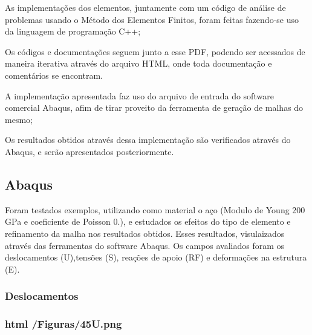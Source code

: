 \begin{DoxyItemize}
\item As implementações dos elementos, juntamente com um código de análise de problemas usando o Método dos Elementos Finitos, foram feitas fazendo-\/se uso da linguagem de programação C++;
\item Os códigos e documentações seguem junto a esse P\+DF, podendo ser acessados de maneira iterativa através do arquivo H\+T\+ML, onde toda documentação e comentários se encontram.
\item A implementação apresentada faz uso do arquivo de entrada do software comercial Abaqus, afim de tirar proveito da ferramenta de geração de malhas do mesmo;
\item Os resultados obtidos através dessa implementação são verificados através do Abaqus, e serão apresentados posteriormente.
\end{DoxyItemize}

\subsection*{Abaqus}


\begin{DoxyItemize}
\item Foram testados exemplos, utilizando como material o aço (Modulo de Young 200 G\+Pa e coeficiente de Poisson 0.), e estudados os efeitos do tipo de elemento e refinamento da malha nos resultados obtidos. Esses resultados, visulaizados através das ferramentas do software Abaqus. Os campos avaliados foram os deslocamentos (U),tensões (S), reações de apoio (RF) e deformações na estrutura (E).
\end{DoxyItemize}

\subsubsection*{Deslocamentos}

\subsubsection*{html /\+Figuras/45U.png}


